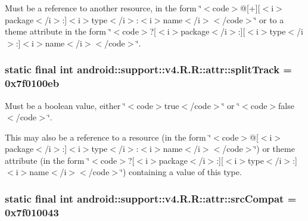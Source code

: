 Must be a reference to another resource, in the form \char`\"{}$<$code$>$@\mbox{[}+\mbox{]}\mbox{[}$<$i$>$package$<$/i$>$:\mbox{]}$<$i$>$type$<$/i$>$:$<$i$>$name$<$/i$>$$<$/code$>$\char`\"{} or to a theme attribute in the form \char`\"{}$<$code$>$?\mbox{[}$<$i$>$package$<$/i$>$:\mbox{]}\mbox{[}$<$i$>$type$<$/i$>$:\mbox{]}$<$i$>$name$<$/i$>$$<$/code$>$\char`\"{}. \hypertarget{classandroid_1_1support_1_1v4_1_1_r_1_1attr_e7ed41fb9693b634c8f8ecea96422be9}{
\subsubsection[{splitTrack}]{\setlength{\rightskip}{0pt plus 5cm}static final int android::support::v4.R.R::attr::splitTrack = 0x7f0100eb}}
\label{classandroid_1_1support_1_1v4_1_1_r_1_1attr_e7ed41fb9693b634c8f8ecea96422be9}


Must be a boolean value, either \char`\"{}$<$code$>$true$<$/code$>$\char`\"{} or \char`\"{}$<$code$>$false$<$/code$>$\char`\"{}. 

This may also be a reference to a resource (in the form \char`\"{}$<$code$>$@\mbox{[}$<$i$>$package$<$/i$>$:\mbox{]}$<$i$>$type$<$/i$>$:$<$i$>$name$<$/i$>$$<$/code$>$\char`\"{}) or theme attribute (in the form \char`\"{}$<$code$>$?\mbox{[}$<$i$>$package$<$/i$>$:\mbox{]}\mbox{[}$<$i$>$type$<$/i$>$:\mbox{]}$<$i$>$name$<$/i$>$$<$/code$>$\char`\"{}) containing a value of this type. \hypertarget{classandroid_1_1support_1_1v4_1_1_r_1_1attr_0cddd589223fbbb1f9a4d2c59c2713c8}{
\subsubsection[{srcCompat}]{\setlength{\rightskip}{0pt plus 5cm}static final int android::support::v4.R.R::attr::srcCompat = 0x7f010043}}
\label{classandroid_1_1support_1_1v4_1_1_r_1_1attr_0cddd589223fbbb1f9a4d2c59c2713c8}


